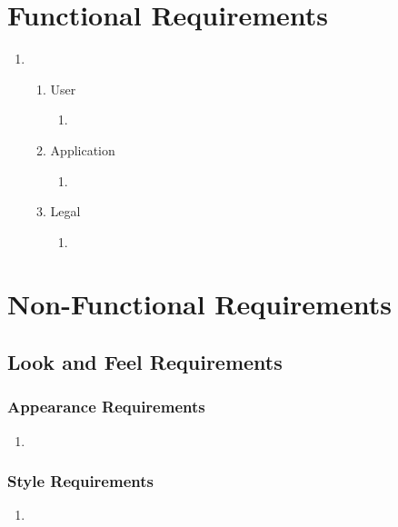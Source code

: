 \documentclass[english]{article}
\begin{document}
\color{black}
\section{Functional Requirements}
\label{sec:functional_requirements}

\begin{enumerate}[{BE}1.]
	\item 
	\begin{enumerate}[{VP1}.1]
		\item User
			\begin{enumerate}
				\item 
		         \end{enumerate}
		\item Application 
			\begin{enumerate}
				\item 
			\end{enumerate}
		\item Legal
			\begin{enumerate}
				\item 
			\end{enumerate}
	\end{enumerate}

	
\end{enumerate}



\section{Non-Functional Requirements}
\label{sec:non-functional_requirements}
\subsection{Look and Feel Requirements}
\label{sub:look_and_feel_requirements}

\subsubsection{Appearance Requirements}
\label{ssub:appearance_requirements}
\begin{enumerate}[{AR}1. ]
\item
\end{enumerate}

\subsubsection{Style Requirements}
\label{ssub:style_requirements}
\begin{enumerate}[{SR}1. ]
\item
\end{enumerate}
\end{document}
